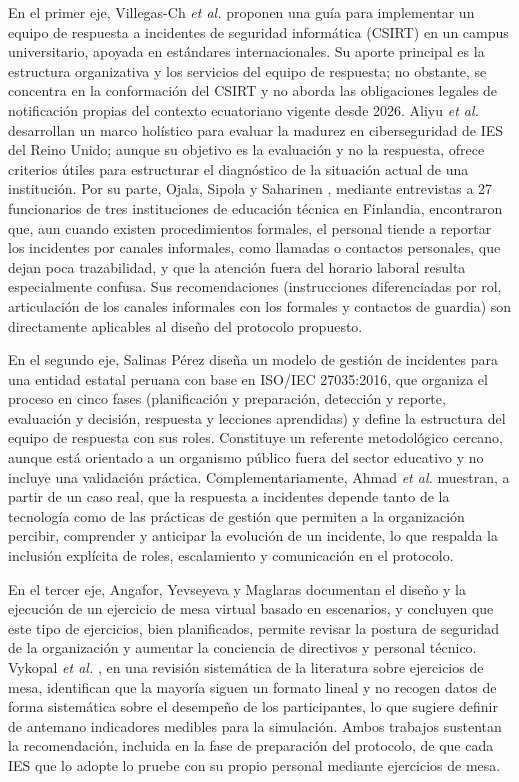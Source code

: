 En el primer eje, Villegas-Ch \textit{et al.} \cite{villegas2021csirt} proponen una guía para implementar un equipo de respuesta a incidentes de seguridad informática (CSIRT) en un campus universitario, apoyada en estándares internacionales. Su aporte principal es la estructura organizativa y los servicios del equipo de respuesta; no obstante, se concentra en la conformación del CSIRT y no aborda las obligaciones legales de notificación propias del contexto ecuatoriano vigente desde 2026. Aliyu \textit{et al.} \cite{aliyu2020holistic} desarrollan un marco holístico para evaluar la madurez en ciberseguridad de IES del Reino Unido; aunque su objetivo es la evaluación y no la respuesta, ofrece criterios útiles para estructurar el diagnóstico de la situación actual de una institución. Por su parte, Ojala, Sipola y Saharinen \cite{ojala2025cybersecurity}, mediante entrevistas a 27 funcionarios de tres instituciones de educación técnica en Finlandia, encontraron que, aun cuando existen procedimientos formales, el personal tiende a reportar los incidentes por canales informales, como llamadas o contactos personales, que dejan poca trazabilidad, y que la atención fuera del horario laboral resulta especialmente confusa. Sus recomendaciones (instrucciones diferenciadas por rol, articulación de los canales informales con los formales y contactos de guardia) son directamente aplicables al diseño del protocolo propuesto.

En el segundo eje, Salinas Pérez \cite{salinas2023modelo} diseña un modelo de gestión de incidentes para una entidad estatal peruana con base en ISO/IEC 27035:2016, que organiza el proceso en cinco fases (planificación y preparación, detección y reporte, evaluación y decisión, respuesta y lecciones aprendidas) y define la estructura del equipo de respuesta con sus roles. Constituye un referente metodológico cercano, aunque está orientado a un organismo público fuera del sector educativo y no incluye una validación práctica. Complementariamente, Ahmad \textit{et al.} \cite{ahmad2021situation} muestran, a partir de un caso real, que la respuesta a incidentes depende tanto de la tecnología como de las prácticas de gestión que permiten a la organización percibir, comprender y anticipar la evolución de un incidente, lo que respalda la inclusión explícita de roles, escalamiento y comunicación en el protocolo.

En el tercer eje, Angafor, Yevseyeva y Maglaras \cite{angafor2023scenario} documentan el diseño y la ejecución de un ejercicio de mesa virtual basado en escenarios, y concluyen que este tipo de ejercicios, bien planificados, permite revisar la postura de seguridad de la organización y aumentar la conciencia de directivos y personal técnico. Vykopal \textit{et al.} \cite{vykopal2024tabletop}, en una revisión sistemática de la literatura sobre ejercicios de mesa, identifican que la mayoría siguen un formato lineal y no recogen datos de forma sistemática sobre el desempeño de los participantes, lo que sugiere definir de antemano indicadores medibles para la simulación. Ambos trabajos sustentan la recomendación, incluida en la fase de preparación del protocolo, de que cada IES que lo adopte lo pruebe con su propio personal mediante ejercicios de mesa.

